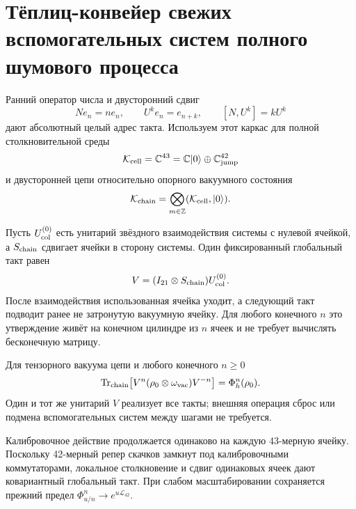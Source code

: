 \chapter{Тёплиц-конвейер свежих вспомогательных систем полного шумового процесса}
\label{ch:v8-full-noise-toeplitz-ancilla-chain-dilation-gate}

Ранний оператор числа и двусторонний сдвиг
\begin{equation}
 Ne_n=ne_n,\qquad U^ke_n=e_{n+k},\qquad [N,U^k]=kU^k
\end{equation}
дают абсолютный целый адрес такта. Используем этот каркас для полной
столкновительной среды
\begin{equation}
 \mathcal K_{\rm cell}=\mathbb C^{43}
 =\mathbb C|0\rangle\oplus\mathbb C^{42}_{\rm jump}
\end{equation}
и двусторонней цепи относительно опорного вакуумного состояния
\begin{equation}
 \mathcal K_{\rm chain}
 =\bigotimes_{m\in\mathbb Z}(\mathcal K_{\rm cell},|0\rangle).
\end{equation}

Пусть $U_{\rm col}^{(0)}$ есть унитарий звёздного взаимодействия системы с
нулевой ячейкой, а $S_{\rm chain}$ сдвигает ячейки в сторону системы.
Один фиксированный глобальный такт равен
\begin{equation}
 V=(I_{21}\otimes S_{\rm chain})U_{\rm col}^{(0)}.
\end{equation}
После взаимодействия использованная ячейка уходит, а следующий такт
подводит ранее не затронутую вакуумную ячейку. Для любого конечного $n$ это
утверждение живёт на конечном цилиндре из $n$ ячеек и не требует вычислять
бесконечную матрицу.

\begin{theorem}
Для тензорного вакуума цепи и любого конечного $n\geq0$
\begin{equation}
 \operatorname{Tr}_{\rm chain}\!\left[
 V^n(\rho_0\otimes\omega_{\rm vac})V^{-n}\right]
 =\Phi_h^n(\rho_0).
\end{equation}
Один и тот же унитарий $V$ реализует все такты; внешняя операция сброс или
подмена вспомогательных систем между шагами не требуется.
\end{theorem}

Калибровочное действие продолжается одинаково на каждую 43-мерную ячейку. Поскольку
42-мерный репер скачков замкнут под калибровочными коммутаторами, локальное столкновение и
сдвиг одинаковых ячеек дают ковариантный глобальный такт. При слабом
масштабировании сохраняется прежний предел $\Phi_{u/n}^n\to e^{u\mathcal
L_{42}}$.

